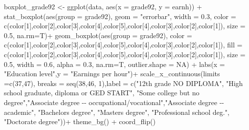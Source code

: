 \documentclass[
]{article}
\newenvironment{Shaded}{\begin{snugshade}}{\end{snugshade}}
\newcommand{\AttributeTok}[1]{\textcolor[rgb]{0.77,0.63,0.00}{#1}}
\newcommand{\ConstantTok}[1]{\textcolor[rgb]{0.00,0.00,0.00}{#1}}
\newcommand{\DecValTok}[1]{\textcolor[rgb]{0.00,0.00,0.81}{#1}}
\newcommand{\FloatTok}[1]{\textcolor[rgb]{0.00,0.00,0.81}{#1}}
\newcommand{\FunctionTok}[1]{\textcolor[rgb]{0.00,0.00,0.00}{#1}}
\newcommand{\NormalTok}[1]{#1}
\newcommand{\OtherTok}[1]{\textcolor[rgb]{0.56,0.35,0.01}{#1}}
\newcommand{\SpecialCharTok}[1]{\textcolor[rgb]{0.00,0.00,0.00}{#1}}
\newcommand{\StringTok}[1]{\textcolor[rgb]{0.31,0.60,0.02}{#1}}
\begin{document}
\begin{Shaded}
\begin{Highlighting}[]
\NormalTok{boxplot\_grade92 }\OtherTok{\textless{}{-}} \FunctionTok{ggplot}\NormalTok{(data, }\FunctionTok{aes}\NormalTok{(}\AttributeTok{x =}\NormalTok{ grade92, }\AttributeTok{y =}\NormalTok{ earnh)) }\SpecialCharTok{+}
  \FunctionTok{stat\_boxplot}\NormalTok{(}\FunctionTok{aes}\NormalTok{(}\AttributeTok{group =}\NormalTok{ grade92), }\AttributeTok{geom =} \StringTok{"errorbar"}\NormalTok{, }\AttributeTok{width =} \FloatTok{0.3}\NormalTok{,}
               \AttributeTok{color =} \FunctionTok{c}\NormalTok{(color[}\DecValTok{1}\NormalTok{],color[}\DecValTok{2}\NormalTok{],color[}\DecValTok{3}\NormalTok{],color[}\DecValTok{4}\NormalTok{],color[}\DecValTok{5}\NormalTok{],color[}\DecValTok{4}\NormalTok{],color[}\DecValTok{3}\NormalTok{],color[}\DecValTok{2}\NormalTok{],color[}\DecValTok{1}\NormalTok{]), }\AttributeTok{size =} \FloatTok{0.5}\NormalTok{, }\AttributeTok{na.rm=}\NormalTok{T)}\SpecialCharTok{+}
  \FunctionTok{geom\_boxplot}\NormalTok{(}\FunctionTok{aes}\NormalTok{(}\AttributeTok{group =}\NormalTok{ grade92),}
               \AttributeTok{color =} \FunctionTok{c}\NormalTok{(color[}\DecValTok{1}\NormalTok{],color[}\DecValTok{2}\NormalTok{],color[}\DecValTok{3}\NormalTok{],color[}\DecValTok{4}\NormalTok{],color[}\DecValTok{5}\NormalTok{],color[}\DecValTok{4}\NormalTok{],color[}\DecValTok{3}\NormalTok{],color[}\DecValTok{2}\NormalTok{],color[}\DecValTok{1}\NormalTok{]), }\AttributeTok{fill =} \FunctionTok{c}\NormalTok{(color[}\DecValTok{1}\NormalTok{],color[}\DecValTok{2}\NormalTok{],color[}\DecValTok{3}\NormalTok{],color[}\DecValTok{4}\NormalTok{],color[}\DecValTok{5}\NormalTok{],color[}\DecValTok{4}\NormalTok{],color[}\DecValTok{3}\NormalTok{],color[}\DecValTok{2}\NormalTok{],color[}\DecValTok{1}\NormalTok{]),}
               \AttributeTok{size =} \FloatTok{0.5}\NormalTok{, }\AttributeTok{width =} \FloatTok{0.6}\NormalTok{, }\AttributeTok{alpha =} \FloatTok{0.3}\NormalTok{, }\AttributeTok{na.rm=}\NormalTok{T, }\AttributeTok{outlier.shape =} \ConstantTok{NA}\NormalTok{) }\SpecialCharTok{+}
  \FunctionTok{labs}\NormalTok{(}\AttributeTok{x =} \StringTok{"Education level"}\NormalTok{,}\AttributeTok{y =} \StringTok{"Earnings per hour"}\NormalTok{)}\SpecialCharTok{+}
  \FunctionTok{scale\_x\_continuous}\NormalTok{(}\AttributeTok{limits =}\FunctionTok{c}\NormalTok{(}\DecValTok{37}\NormalTok{,}\DecValTok{47}\NormalTok{), }\AttributeTok{breaks =} \FunctionTok{seq}\NormalTok{(}\DecValTok{38}\NormalTok{,}\DecValTok{46}\NormalTok{, }\DecValTok{1}\NormalTok{),}\AttributeTok{label =} \FunctionTok{c}\NormalTok{(}\StringTok{"12th grade NO DIPLOMA"}\NormalTok{, }\StringTok{"High school graduate, diploma or GED START"}\NormalTok{, }\StringTok{"Some college but no degree"}\NormalTok{,}\StringTok{"Associate degree {-}{-} occupational/vocational"}\NormalTok{,}\StringTok{"Associate degree {-}{-} academic"}\NormalTok{, }\StringTok{"Bachelor\textquotesingle{}s degree"}\NormalTok{, }\StringTok{"Master\textquotesingle{}s degree"}\NormalTok{, }\StringTok{"Professional school deg."}\NormalTok{, }\StringTok{"Doctorate degree"}\NormalTok{))}\SpecialCharTok{+}
  \FunctionTok{theme\_bg}\NormalTok{() }\SpecialCharTok{+}
  \FunctionTok{coord\_flip}\NormalTok{()}


\end{Highlighting}
\end{Shaded}
\end{document}
